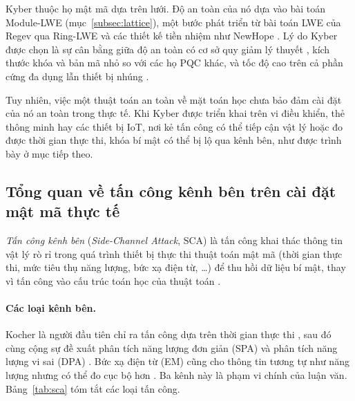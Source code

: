 \documentclass[../LuanVan.tex]{subfiles}
\begin{document}
Kyber thuộc họ mật mã dựa trên lưới. Độ an toàn của nó dựa vào bài toán Module-LWE (mục~\ref{subsec:lattice}), một bước phát triển từ bài toán LWE của Regev \cite{Regev05} qua Ring-LWE \cite{LyubashevskyPR13} và các thiết kế tiền nhiệm như NewHope \cite{Alkim16}. Lý do Kyber được chọn là sự cân bằng giữa độ an toàn có cơ sở quy giảm lý thuyết \cite{LangloisStehle15}, kích thước khóa và bản mã nhỏ so với các họ PQC khác, và tốc độ cao trên cả phần cứng đa dụng lẫn thiết bị nhúng \cite{Bos18,KannwischerRSS19}.

Tuy nhiên, việc một thuật toán an toàn về mặt toán học chưa bảo đảm cài đặt của nó an toàn trong thực tế. Khi Kyber được triển khai trên vi điều khiển, thẻ thông minh hay các thiết bị IoT, nơi kẻ tấn công có thể tiếp cận vật lý hoặc đo được thời gian thực thi, khóa bí mật có thể bị lộ qua kênh bên, như được trình bày ở mục tiếp theo.

\subsection{Tổng quan về tấn công kênh bên trên cài đặt mật mã thực tế}\label{subsec:sca}

\begin{dn}
    \textit{Tấn công kênh bên} (\textit{Side-Channel Attack}, SCA) là tấn công khai thác thông tin vật lý rò rỉ trong quá trình thiết bị thực thi thuật toán mật mã (thời gian thực thi, mức tiêu thụ năng lượng, bức xạ điện từ, \dots) để thu hồi dữ liệu bí mật, thay vì tấn công vào cấu trúc toán học của thuật toán \cite{MangardOP07}.
\end{dn}

\paragraph{Các loại kênh bên.} Kocher là người đầu tiên chỉ ra tấn công dựa trên thời gian thực thi \cite{Kocher96}, sau đó cùng cộng sự đề xuất phân tích năng lượng đơn giản (SPA) và phân tích năng lượng vi sai (DPA) \cite{KocherJJ99}. Bức xạ điện từ (EM) cũng cho thông tin tương tự như năng lượng nhưng có thể đo cục bộ hơn \cite{QuisquaterSamyde01,GandolfiMO01}. Ba kênh này là phạm vi chính của luận văn. Bảng~\ref{tab:sca} tóm tắt các loại tấn công.
\end{document}
